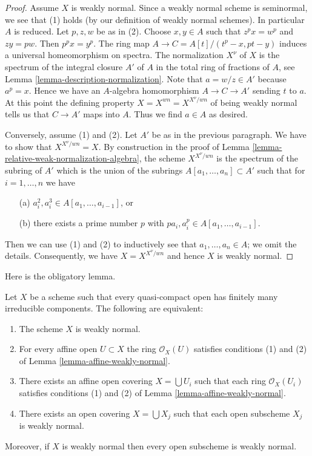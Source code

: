 \begin{proof}
Assume $X$ is weakly normal. Since a weakly normal scheme is seminormal,
we see that (1) holds (by our definition of weakly normal schemes).
In particular $A$ is reduced. Let $p, z, w$ be as in (2).
Choose $x, y \in A$ such that $z^p x = w^p$ and $zy = pw$.
Then $p^p x = y^p$. The ring map
$A \to C = A[t]/(t^p - x, pt - y)$ induces a universal homeomorphism
on spectra. The normalization $X^\nu$ of $X$
is the spectrum of the integral closure $A'$
of $A$ in the total ring of fractions of $A$, see
Lemma \ref{lemma-description-normalization}.
Note that $a = w/z \in A'$ because $a^p = x$.
Hence we have an $A$-algebra homomorphism $A \to C \to A'$
sending $t$ to $a$.
At this point the defining property $X = X^{wn} = X^{X^\nu/wn}$
of being weakly normal tells us that $C \to A'$ maps into $A$.
Thus we find $a \in A$ as desired.

\medskip\noindent
Conversely, assume (1) and (2). Let $A'$ be as in the previous paragraph.
We have to show that $X^{X^\nu/wn} = X$. By construction in the proof
of Lemma \ref{lemma-relative-weak-normalization-algebra}, the scheme
$X^{X^\nu/wn}$ is the spectrum of the subring of $A'$
which is the union of the subrings $A[a_1, \ldots, a_n] \subset A'$
such that for $i = 1, \ldots, n$ we have
\begin{enumerate}
\item[(a)] $a_i^2, a_i^3 \in A[a_1, \ldots, a_{i - 1}]$, or
\item[(b)] there exists a prime number $p$ with
$pa_i, a_i^p \in A[a_1, \ldots, a_{i - 1}]$.
\end{enumerate}
Then we can use (1) and (2) to inductively see that $a_1, \ldots, a_n \in A$;
we omit the details. Consequently, we have $X = X^{X^\nu/wn}$ and hence
$X$ is weakly normal.
\end{proof}

\noindent
Here is the obligatory lemma.

\begin{lemma}
\label{lemma-locally-weakly-normal}
Let $X$ be a scheme such that every quasi-compact open has
finitely many irreducible components. The following are equivalent:
\begin{enumerate}
\item The scheme $X$ is weakly normal.
\item For every affine open $U \subset X$ the ring $\mathcal{O}_X(U)$
satisfies conditions (1) and (2) of Lemma \ref{lemma-affine-weakly-normal}.
\item There exists an affine open covering $X = \bigcup U_i$ such that
each ring $\mathcal{O}_X(U_i)$
satisfies conditions (1) and (2) of Lemma \ref{lemma-affine-weakly-normal}.
\item There exists an open covering $X = \bigcup X_j$
such that each open subscheme $X_j$ is weakly normal.
\end{enumerate}
Moreover, if $X$ is weakly normal then every open subscheme is weakly normal.
\end{lemma}

